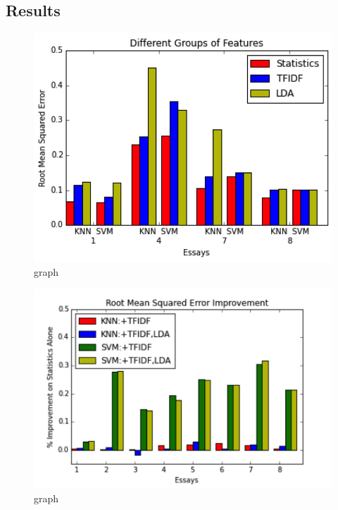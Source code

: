 \documentclass{article}
\begin{document}
\subsection{Results}
\vspace{-2em}
\begin{figure}[H]
\centering
\centerline{\includegraphics[width=\columnwidth]{"321"}}
\vspace{-1em}
\caption{graph}
\label{321}
\vskip -0.2in
\end{figure} 
\begin{figure}[H]
\centering
\centerline{\includegraphics[width=\columnwidth]{"322"}}
\vspace{-1em}
\caption{graph}
\label{322}
\vskip -0.2in
\end{figure} 
\end{document}
